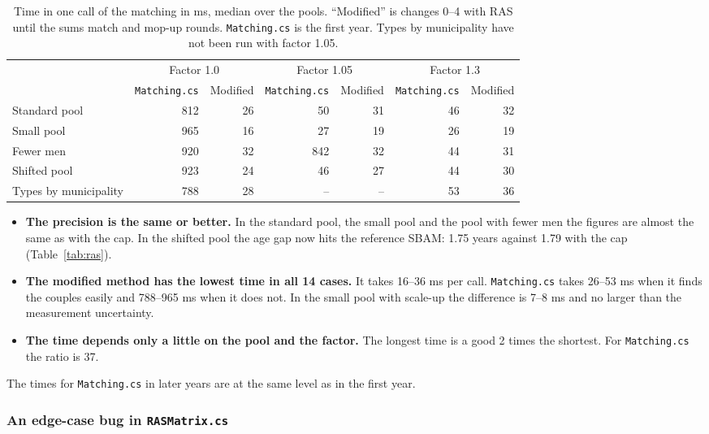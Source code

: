 \documentclass[12pt,a4paper]{article}
\newcommand{\kode}[1]{\texttt{#1}}
\begin{document}
\begin{table}[htb]
\centering
\caption{Time in one call of the matching in ms, median over the pools. ``Modified'' is changes
0--4 with RAS until the sums match and mop-up rounds. \kode{Matching.cs} is the first year. Types
by municipality have not been run with factor 1.05.}
\label{tab:hurtigtid}
\small\setlength{\tabcolsep}{5pt}
\begin{tabular}{@{}lrrrrrr@{}}
\toprule
 & \multicolumn{2}{c}{Factor 1.0} & \multicolumn{2}{c}{Factor 1.05} & \multicolumn{2}{c}{Factor 1.3} \\
\cmidrule(lr){2-3}\cmidrule(lr){4-5}\cmidrule(l){6-7}
 & \kode{Matching.cs} & Modified & \kode{Matching.cs} & Modified & \kode{Matching.cs} & Modified \\
\midrule
Standard pool & 812 & 26 & 50 & 31 & 46 & 32 \\
Small pool & 965 & 16 & 27 & 19 & 26 & 19 \\
Fewer men & 920 & 32 & 842 & 32 & 44 & 31 \\
Shifted pool & 923 & 24 & 46 & 27 & 44 & 30 \\
Types by municipality & 788 & 28 & -- & -- & 53 & 36 \\
\bottomrule
\end{tabular}
\end{table}

\begin{itemize}
\item \textbf{The precision is the same or better.} In the standard pool, the small pool and the
pool with fewer men the figures are almost the same as with the cap. In the shifted pool the age
gap now hits the reference SBAM: 1.75 years against 1.79 with the cap (Table~\ref{tab:ras}).
\item \textbf{The modified method has the lowest time in all 14 cases.} It takes 16--36 ms per
call. \kode{Matching.cs} takes 26--53 ms when it finds the couples easily and 788--965 ms when it
does not. In the small pool with scale-up the difference is 7--8 ms and no larger than the
measurement uncertainty.
\item \textbf{The time depends only a little on the pool and the factor.} The longest time is a
good 2 times the shortest. For \kode{Matching.cs} the ratio is 37.
\end{itemize}

The times for \kode{Matching.cs} in later years are at the same level as in the first year.

\subsubsection*{An edge-case bug in \kode{RASMatrix.cs}}
\end{document}
